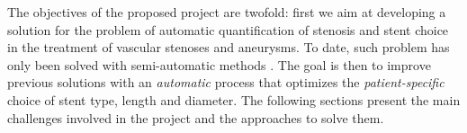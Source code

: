 % 
% 
% 



The objectives of the proposed project are twofold: first we aim at developing a solution for the problem of automatic quantification of stenosis and stent choice in the treatment of vascular stenoses and aneurysms. To date, such problem has only been solved with semi-automatic methods \citep{Gremse01092011,Scherl200721,HERN-06b,Bemmel}. The goal is then to improve previous solutions with an {\em automatic} process that optimizes the {\em patient-specific} choice of stent type, length and diameter. The following sections present the main challenges involved in the project and the approaches to solve them. 


